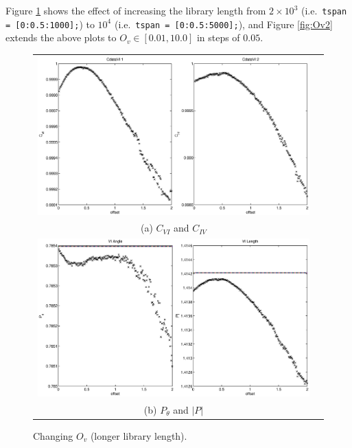 \documentclass[a4paper,11pt]{article}
\begin{document}
Figure \ref{fig:Ov1} shows the effect of increasing the library length from $2\times10^3$ (i.e.\ {\tt tspan = [0:0.5:1000];}) to $10^4$ (i.e.\ {\tt tspan = [0:0.5:5000];}), and Figure \ref{fig:Ov2} extends the above plots to $O_v\in[0.01,10.0]$ in steps of $0.05$.
\begin{figure}[H]
\begin{tabular}{cc}
\includegraphics[scale=0.5]{RLCircuitPlots/RLcirc_varyV_offsetLup2.eps} \\
(a) $C_{VI}$ and $C_{IV}$ \\[6pt]
\includegraphics[scale=0.5]{RLCircuitPlots/RLcirc_varyV_offsetLup.eps} \\
(b) $P_\theta$ and $|P|$ \\[6pt]
\end{tabular}
\caption{Changing $O_v$ (longer library length).}
\label{fig:Ov1}
\end{figure}
\end{document}
